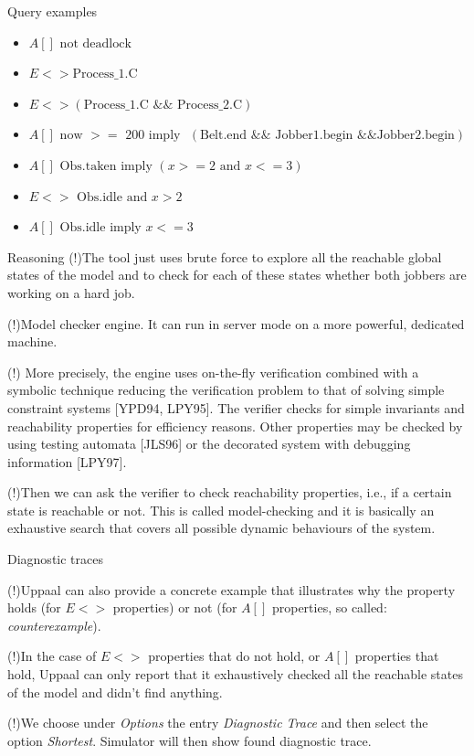 \documentclass{beamer}
\begin{document}
\begin{frame}{Query examples}
	\begin{itemize}
		\item $A[] \text{ not deadlock}$
		\item $E<> \text{Process\_1.C}$
		\item $E<> (\text{Process\_1.C } \&\& \text{ Process\_2.C})$
		\item $A[] \text{ now } >= \text{ 200 imply }$
		$(\text{Belt.end } \&\& \text{ Jobber1.begin } \&\& \text{Jobber2.begin})$
		\item $A[] \text{ Obs.taken imply } (x>=2 \text{ and } x<=3)$
		\item $E<> \text{ Obs.idle and } x>2$
		\item $A[] \text{ Obs.idle imply } x<=3$
		
	\end{itemize}
\end{frame}

\begin{frame}{Reasoning}
	(!)The tool just uses brute force to explore all the reachable global states of the model and to check for each of these	states whether both jobbers are working on a hard job.
	
	
	(!)Model checker engine. It can run in server mode on a more powerful, dedicated machine.

	(!) 
	More precisely, the engine uses on-the-fly verification combined with a symbolic technique reducing the verification problem to that of solving simple constraint systems [YPD94, LPY95]. The
	verifier checks for simple invariants and reachability properties for efficiency reasons. Other properties may be checked by using testing automata [JLS96] or the decorated system with debugging
	information [LPY97].
	
	(!)Then we can ask the verifier to check reachability properties, i.e., if a certain
	state is reachable or not. This is called model-checking and it is basically an exhaustive search
	that covers all possible dynamic behaviours of the system.
\end{frame}

\begin{frame}{Diagnostic traces}
	
	(!)Uppaal can also provide a concrete example that illustrates why the property holds (for $E<>$ properties) or not (for $A[]$ properties, so called: \textit{counterexample}).\newline
	
	(!)In the case of $E<>$ properties that do not hold, or $A[]$ properties that hold, Uppaal can only report that it exhaustively checked all the reachable states of the model and didn’t find anything.\newline
	
	(!)We choose under \textit{Options} the entry \textit{Diagnostic Trace} and then select the option \textit{Shortest}. Simulator will then show found diagnostic trace.
\end{frame}
\end{document}
